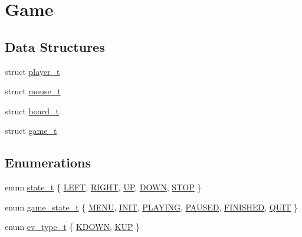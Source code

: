 \hypertarget{group___game}{}\section{Game}
\label{group___game}
\subsection*{Data Structures}
\begin{DoxyCompactItemize}
\item 
struct \hyperlink{structplayer__t}{player\+\_\+t}
\item 
struct \hyperlink{structmouse__t}{mouse\+\_\+t}
\item 
struct \hyperlink{structboard__t}{board\+\_\+t}
\item 
struct \hyperlink{structgame__t}{game\+\_\+t}
\end{DoxyCompactItemize}
\subsection*{Enumerations}
\begin{DoxyCompactItemize}
\item 
enum \hyperlink{group___game_gaa0aafed44fec19806d8f9ad834be1248}{state\+\_\+t} \{ \newline
\hyperlink{group___game_ggaa0aafed44fec19806d8f9ad834be1248adb45120aafd37a973140edee24708065}{L\+E\+FT}, 
\hyperlink{group___game_ggaa0aafed44fec19806d8f9ad834be1248aec8379af7490bb9eaaf579cf17876f38}{R\+I\+G\+HT}, 
\hyperlink{group___game_ggaa0aafed44fec19806d8f9ad834be1248aba595d8bca8bc5e67c37c0a9d89becfa}{UP}, 
\hyperlink{group___game_ggaa0aafed44fec19806d8f9ad834be1248a9b0b4a95b99523966e0e34ffdadac9da}{D\+O\+WN}, 
\newline
\hyperlink{group___game_ggaa0aafed44fec19806d8f9ad834be1248a679ee5320d66c8322e310daeb2ee99b8}{S\+T\+OP}
 \}
\item 
enum \hyperlink{group___game_ga4edce1ca040716922b6e4a79be4e414d}{game\+\_\+state\+\_\+t} \{ \newline
\hyperlink{group___game_gga4edce1ca040716922b6e4a79be4e414da4c40e60bc71a32b924ce1f08d57f9721}{M\+E\+NU}, 
\hyperlink{group___game_gga4edce1ca040716922b6e4a79be4e414da0cb1b2c6a7db1f1084886c98909a3f36}{I\+N\+IT}, 
\hyperlink{group___game_gga4edce1ca040716922b6e4a79be4e414daf095245f5cebc27a97a124345269fed8}{P\+L\+A\+Y\+I\+NG}, 
\hyperlink{group___game_gga4edce1ca040716922b6e4a79be4e414dad4bb05915de3c370d3a33d4f51389655}{P\+A\+U\+S\+ED}, 
\newline
\hyperlink{group___game_gga4edce1ca040716922b6e4a79be4e414dadbd1812bee789fbf3548cf79d3f2b400}{F\+I\+N\+I\+S\+H\+ED}, 
\hyperlink{group___game_gga4edce1ca040716922b6e4a79be4e414da76bdc8adfd6c6463ab269ff4c06be9b4}{Q\+U\+IT}
 \}
\item 
enum \hyperlink{group___game_gaabca14b349ba212174a00ffc1d2a2f31}{ev\+\_\+type\+\_\+t} \{ \hyperlink{group___game_ggaabca14b349ba212174a00ffc1d2a2f31a1a1b5730082d8a99750ec1442ef473b3}{K\+D\+O\+WN}, 
\hyperlink{group___game_ggaabca14b349ba212174a00ffc1d2a2f31a7811143a3a1f6274d18050dd91a6586e}{K\+UP}
 \}
\end{DoxyCompactItemize}
